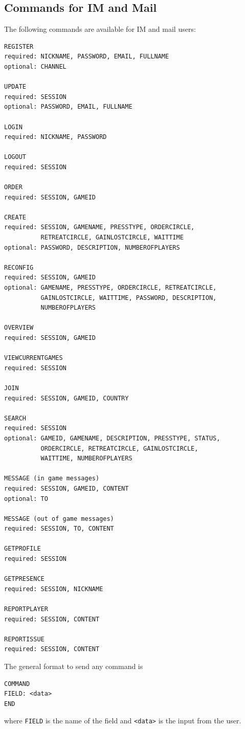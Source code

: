 \documentclass[11pt,a4paper]{report}
\begin{document}
\newpage
\subsection{Commands for IM and Mail}
\label{list of all commands}
The following commands are available for IM and mail users:

\begin{verbatim}
REGISTER
required: NICKNAME, PASSWORD, EMAIL, FULLNAME
optional: CHANNEL

UPDATE
required: SESSION
optional: PASSWORD, EMAIL, FULLNAME

LOGIN
required: NICKNAME, PASSWORD

LOGOUT
required: SESSION

ORDER
required: SESSION, GAMEID

CREATE
required: SESSION, GAMENAME, PRESSTYPE, ORDERCIRCLE,
          RETREATCIRCLE, GAINLOSTCIRCLE, WAITTIME
optional: PASSWORD, DESCRIPTION, NUMBEROFPLAYERS

RECONFIG
required: SESSION, GAMEID
optional: GAMENAME, PRESSTYPE, ORDERCIRCLE, RETREATCIRCLE,
          GAINLOSTCIRCLE, WAITTIME, PASSWORD, DESCRIPTION,
          NUMBEROFPLAYERS

OVERVIEW
required: SESSION, GAMEID

VIEWCURRENTGAMES
required: SESSION

JOIN
required: SESSION, GAMEID, COUNTRY

SEARCH
required: SESSION
optional: GAMEID, GAMENAME, DESCRIPTION, PRESSTYPE, STATUS,
          ORDERCIRCLE, RETREATCIRCLE, GAINLOSTCIRCLE,
          WAITTIME, NUMBEROFPLAYERS

MESSAGE (in game messages)
required: SESSION, GAMEID, CONTENT
optional: TO

MESSAGE (out of game messages)
required: SESSION, TO, CONTENT

GETPROFILE
required: SESSION

GETPRESENCE
required: SESSION, NICKNAME

REPORTPLAYER
required: SESSION, CONTENT

REPORTISSUE
required: SESSION, CONTENT
\end{verbatim}


The general format to send any command is
\begin{verbatim}
COMMAND
FIELD: <data>
END
\end{verbatim}

where \verb|FIELD| is the name of the field and \verb|<data>| is the
input from the user.
\end{document}

